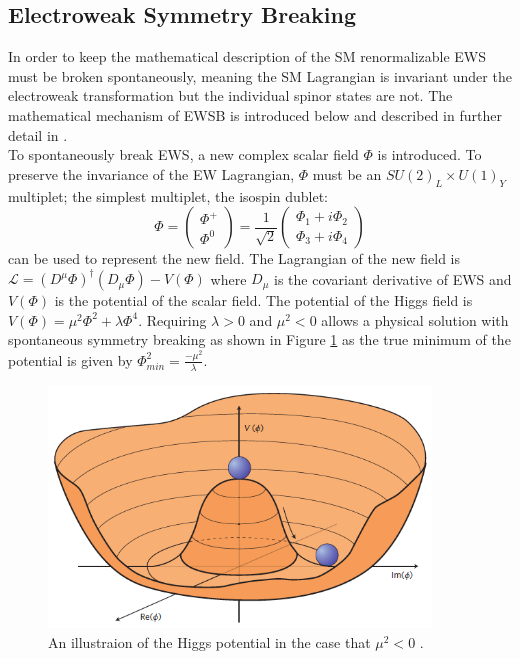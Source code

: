 \subsection{Electroweak Symmetry Breaking}\label{sec:ews_sm}
In order to keep the mathematical description of the SM renormalizable EWS must be broken spontaneously, meaning the SM Lagrangian is invariant under the electroweak transformation but the individual spinor states are not. The mathematical mechanism of EWSB is introduced below and described in further detail in \cite{higgs_physics_notes}.\\

To spontaneously break EWS, a new complex scalar field $\Phi$ is introduced. To preserve the invariance of the EW Lagrangian, $\Phi$ must be an $SU(2)_L\times U(1)_Y$ multiplet; the simplest multiplet, the isospin dublet:
$$
\Phi=\begin{pmatrix}\Phi^+ \\ \Phi^0\end{pmatrix} = \frac{1}{\sqrt{2}} \begin{pmatrix}\Phi_1+i\Phi_2 \\ \Phi_3+i\Phi_4\end{pmatrix}
$$
can be used to represent the new field. The Lagrangian of the new field is $\mathcal{L}=(D^{\mu}\Phi)^{\dagger}(D_{\mu}\Phi)-V(\Phi)$ where $D_{\mu}$ is the covariant derivative of EWS and $V(\Phi)$ is the potential of the scalar field. The potential of the Higgs field is $V(\Phi)=\mu^2\Phi^2+\lambda\Phi^4$. Requiring $\lambda>0$ and $\mu^2<0$ allows a physical solution with spontaneous symmetry breaking as shown in Figure \ref{fig:higgs_potent} as the true minimum of the potential is given by $\Phi^2_{min}=\frac{-\mu^2}{\lambda}$.

\begin{figure}[h]
    \centering
    \includegraphics[width=4in]{figures/chapter1/higgs_potential.png}
    \caption{An illustraion of the Higgs potential in the case that $\mu^2<0$ \cite{higgs_physics_notes}.}
    \label{fig:higgs_potent}
\end{figure}

